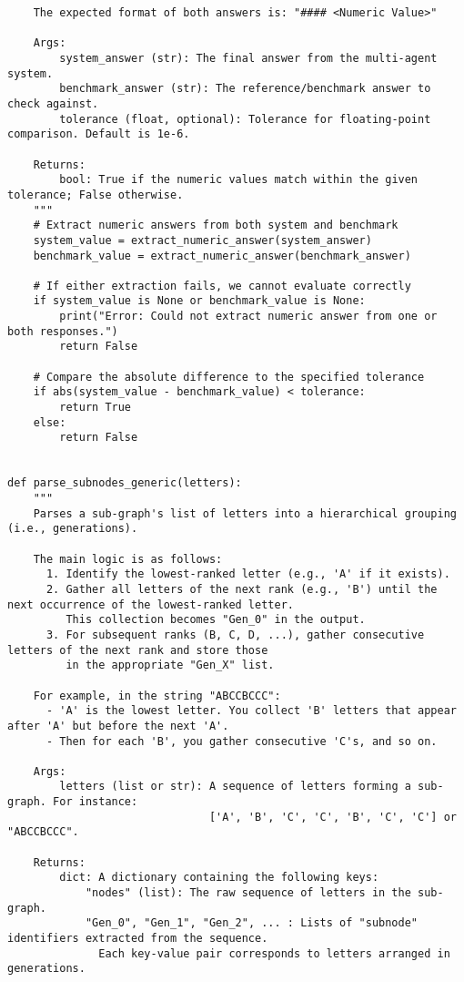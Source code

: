 \begin{lstlisting}
    The expected format of both answers is: "#### <Numeric Value>"

    Args:
        system_answer (str): The final answer from the multi-agent system.
        benchmark_answer (str): The reference/benchmark answer to check against.
        tolerance (float, optional): Tolerance for floating-point comparison. Default is 1e-6.

    Returns:
        bool: True if the numeric values match within the given tolerance; False otherwise.
    """
    # Extract numeric answers from both system and benchmark
    system_value = extract_numeric_answer(system_answer)
    benchmark_value = extract_numeric_answer(benchmark_answer)

    # If either extraction fails, we cannot evaluate correctly
    if system_value is None or benchmark_value is None:
        print("Error: Could not extract numeric answer from one or both responses.")
        return False

    # Compare the absolute difference to the specified tolerance
    if abs(system_value - benchmark_value) < tolerance:
        return True
    else:
        return False


def parse_subnodes_generic(letters):
    """
    Parses a sub-graph's list of letters into a hierarchical grouping (i.e., generations).

    The main logic is as follows:
      1. Identify the lowest-ranked letter (e.g., 'A' if it exists).
      2. Gather all letters of the next rank (e.g., 'B') until the next occurrence of the lowest-ranked letter.
         This collection becomes "Gen_0" in the output.
      3. For subsequent ranks (B, C, D, ...), gather consecutive letters of the next rank and store those
         in the appropriate "Gen_X" list.

    For example, in the string "ABCCBCCC":
      - 'A' is the lowest letter. You collect 'B' letters that appear after 'A' but before the next 'A'.
      - Then for each 'B', you gather consecutive 'C's, and so on.

    Args:
        letters (list or str): A sequence of letters forming a sub-graph. For instance:
                               ['A', 'B', 'C', 'C', 'B', 'C', 'C'] or "ABCCBCCC".

    Returns:
        dict: A dictionary containing the following keys:
            "nodes" (list): The raw sequence of letters in the sub-graph.
            "Gen_0", "Gen_1", "Gen_2", ... : Lists of "subnode" identifiers extracted from the sequence.
              Each key-value pair corresponds to letters arranged in generations.


\end{lstlisting}
